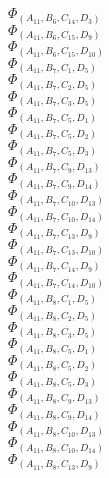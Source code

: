\documentclass[14pt]{article}
\begin{document}
    $\Phi_{({A}_{11}, {B}_{6}, {C}_{14}, {D}_{3})}$ \\ 
    $\Phi_{({A}_{11}, {B}_{6}, {C}_{15}, {D}_{9})}$ \\ 
    $\Phi_{({A}_{11}, {B}_{6}, {C}_{15}, {D}_{10})}$ \\ 
    $\Phi_{({A}_{11}, {B}_{7}, {C}_{1}, {D}_{5})}$ \\ 
    $\Phi_{({A}_{11}, {B}_{7}, {C}_{2}, {D}_{5})}$ \\ 
    $\Phi_{({A}_{11}, {B}_{7}, {C}_{3}, {D}_{5})}$ \\ 
    $\Phi_{({A}_{11}, {B}_{7}, {C}_{5}, {D}_{1})}$ \\ 
    $\Phi_{({A}_{11}, {B}_{7}, {C}_{5}, {D}_{2})}$ \\ 
    $\Phi_{({A}_{11}, {B}_{7}, {C}_{5}, {D}_{3})}$ \\ 
    $\Phi_{({A}_{11}, {B}_{7}, {C}_{9}, {D}_{13})}$ \\ 
    $\Phi_{({A}_{11}, {B}_{7}, {C}_{9}, {D}_{14})}$ \\ 
    $\Phi_{({A}_{11}, {B}_{7}, {C}_{10}, {D}_{13})}$ \\ 
    $\Phi_{({A}_{11}, {B}_{7}, {C}_{10}, {D}_{14})}$ \\ 
    $\Phi_{({A}_{11}, {B}_{7}, {C}_{13}, {D}_{9})}$ \\ 
    $\Phi_{({A}_{11}, {B}_{7}, {C}_{13}, {D}_{10})}$ \\ 
    $\Phi_{({A}_{11}, {B}_{7}, {C}_{14}, {D}_{9})}$ \\ 
    $\Phi_{({A}_{11}, {B}_{7}, {C}_{14}, {D}_{10})}$ \\ 
    $\Phi_{({A}_{11}, {B}_{8}, {C}_{1}, {D}_{5})}$ \\ 
    $\Phi_{({A}_{11}, {B}_{8}, {C}_{2}, {D}_{5})}$ \\ 
    $\Phi_{({A}_{11}, {B}_{8}, {C}_{3}, {D}_{5})}$ \\ 
    $\Phi_{({A}_{11}, {B}_{8}, {C}_{5}, {D}_{1})}$ \\ 
    $\Phi_{({A}_{11}, {B}_{8}, {C}_{5}, {D}_{2})}$ \\ 
    $\Phi_{({A}_{11}, {B}_{8}, {C}_{5}, {D}_{3})}$ \\ 
    $\Phi_{({A}_{11}, {B}_{8}, {C}_{9}, {D}_{13})}$ \\ 
    $\Phi_{({A}_{11}, {B}_{8}, {C}_{9}, {D}_{14})}$ \\ 
    $\Phi_{({A}_{11}, {B}_{8}, {C}_{10}, {D}_{13})}$ \\ 
    $\Phi_{({A}_{11}, {B}_{8}, {C}_{10}, {D}_{14})}$ \\ 
    $\Phi_{({A}_{11}, {B}_{8}, {C}_{13}, {D}_{9})}$ \\ 
\end{document}

